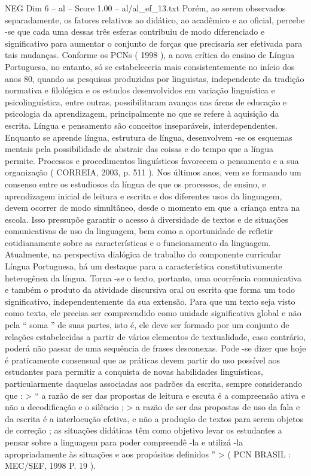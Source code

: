 \begin{textsample}{NEG Dim 6 – al – Score 1.00 – al/al\_ef\_13.txt}
Porém, ao serem observados separadamente, os fatores relativos ao didático, ao acadêmico e ao oficial, percebe -se que cada uma dessas três esferas contribuiu de modo diferenciado e significativo para aumentar o conjunto de forças que precisaria ser efetivada para tais mudanças.
Conforme os PCNs ( 1998 ), a nova crítica do ensino de Língua Portuguesa, no entanto, só se estabeleceria mais consistentemente no início dos anos 80, quando as pesquisas produzidas por linguistas, independente da tradição normativa e filológica e os estudos desenvolvidos em variação linguística e psicolinguística, entre outras, possibilitaram avanços nas áreas de educação e psicologia da aprendizagem, principalmente no que se refere à aquisição da escrita.
Língua e pensamento são conceitos inseparáveis, interdependentes.
Enquanto se aprende língua, estrutura de língua, desenvolvem -se os esquemas mentais pela possibilidade de abstrair das coisas e do tempo que a língua permite.
Processos e procedimentos linguísticos favorecem o pensamento e a sua organização ( CORREIA, 2003, p. 511 ).
Nos últimos anos, vem se formando um consenso entre os estudiosos da língua de que os processos, de ensino, e aprendizagem inicial de leitura e escrita e dos diferentes usos da linguagem, devem ocorrer de modo simultâneo, desde o momento em que a criança entra na escola.
Isso pressupõe garantir o acesso à diversidade de textos e de situações comunicativas de uso da linguagem, bem como a oportunidade de refletir cotidianamente sobre as características e o funcionamento da linguagem.
Atualmente, na perspectiva dialógica de trabalho do componente curricular Língua Portuguesa, há um destaque para a característica constitutivamente heterogênea da língua.
Torna -se o texto, portanto, uma ocorrência comunicativa e também o produto da atividade discursiva oral ou escrita que forma um todo significativo, independentemente da sua extensão.
Para que um texto seja visto como texto, ele precisa ser compreendido como unidade significativa global e não pela “ soma ” de suas partes, isto é, ele deve ser formado por um conjunto de relações estabelecidas a partir de vários elementos de textualidade, caso contrário, poderá não passar de uma sequência de frases desconexas.
Pode -se dizer que hoje é praticamente consensual que as práticas devem partir do uso possível aos estudantes para permitir a conquista de novas habilidades linguísticas, particularmente daquelas associadas aos padrões da escrita, sempre considerando que : > “ a razão de ser das propostas de leitura e escuta é a compreensão ativa e não a decodificação e o silêncio ; > a razão de ser das propostas de uso da fala e da escrita é a interlocução efetiva, e não a produção de textos para serem objetos de correção ; as situações didáticas têm como objetivo levar os estudantes a pensar sobre a linguagem para poder compreendê -la e utilizá -la apropriadamente às situações e aos propósitos definidos ” > ( PCN BRASIL : MEC/SEF, 1998 P. 19 ).

\end{textsample}
